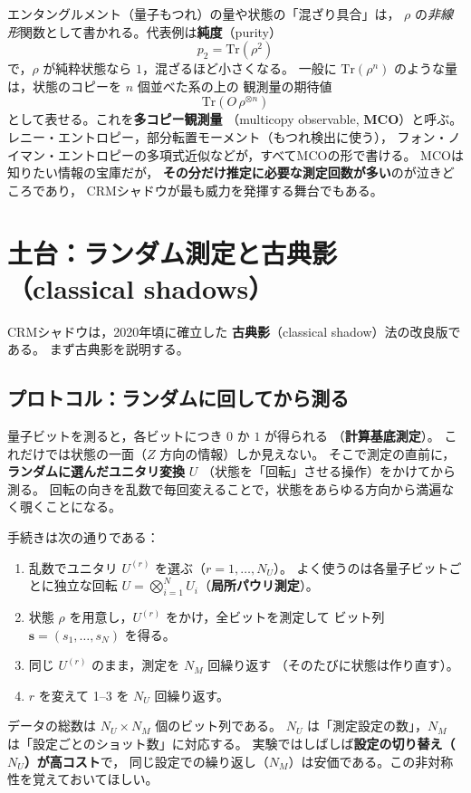 \documentclass[11pt]{ltjsarticle}
\newcommand{\Tr}{\mathrm{Tr}}
\newcommand{\NU}{N_U}
\newcommand{\NM}{N_M}
\begin{document}
エンタングルメント（量子もつれ）の量や状態の「混ざり具合」は，
$\rho$ の\emph{非線形}関数として書かれる。代表例は\textbf{純度}（purity）
\begin{equation}
  p_2 = \Tr(\rho^2)
\end{equation}
で，$\rho$ が純粋状態なら $1$，混ざるほど小さくなる。
一般に $\Tr(\rho^n)$ のような量は，状態のコピーを $n$ 個並べた系の上の
観測量の期待値
\begin{equation}
  \Tr\!\left(O\,\rho^{\otimes n}\right)
\end{equation}
として表せる。これを\textbf{多コピー観測量}
（multicopy observable, \textbf{MCO}）と呼ぶ。
レニー・エントロピー，部分転置モーメント（もつれ検出に使う），
フォン・ノイマン・エントロピーの多項式近似などが，すべてMCOの形で書ける。
MCOは知りたい情報の宝庫だが，
\textbf{その分だけ推定に必要な測定回数が多い}のが泣きどころであり，
CRMシャドウが最も威力を発揮する舞台でもある。

\section{土台：ランダム測定と古典影（classical shadows）}

CRMシャドウは，2020年頃に確立した
\textbf{古典影}（classical shadow）法\cite{Huang2020}の改良版である。
まず古典影を説明する。

\subsection{プロトコル：ランダムに回してから測る}

量子ビットを測ると，各ビットにつき $0$ か $1$ が得られる
（\textbf{計算基底測定}）。
これだけでは状態の一面（$Z$ 方向の情報）しか見えない。
そこで測定の直前に，\textbf{ランダムに選んだユニタリ変換} $U$
（状態を「回転」させる操作）をかけてから測る。
回転の向きを乱数で毎回変えることで，状態をあらゆる方向から満遍なく覗くことになる。

手続きは次の通りである：
\begin{enumerate}
  \item 乱数でユニタリ $U^{(r)}$ を選ぶ（$r = 1,\dots,\NU$）。
        よく使うのは各量子ビットごとに独立な回転
        $U = \bigotimes_{i=1}^{N} U_i$（\textbf{局所パウリ測定}）。
  \item 状態 $\rho$ を用意し，$U^{(r)}$ をかけ，全ビットを測定して
        ビット列 $\mathbf{s} = (s_1,\dots,s_N)$ を得る。
  \item 同じ $U^{(r)}$ のまま，測定を $\NM$ 回繰り返す
        （そのたびに状態は作り直す）。
  \item $r$ を変えて 1--3 を $\NU$ 回繰り返す。
\end{enumerate}
データの総数は $\NU \times \NM$ 個のビット列である。
$\NU$ は「測定設定の数」，$\NM$ は「設定ごとのショット数」に対応する。
実験ではしばしば\textbf{設定の切り替え（$\NU$）が高コスト}で，
同じ設定での繰り返し（$\NM$）は安価である。この非対称性を覚えておいてほしい。
\end{document}
